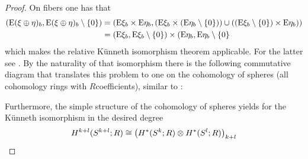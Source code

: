 \begin{Cor}
\begin{proof}
    On fibers one has that
    \begin{align*}
      (\mathrm{E}(\xi\oplus\eta)_b, {\mathrm{E}(\xi\oplus\eta)_b}\setminus\{0\})
      &= \left(
        \mathrm{E}\xi_b\times\mathrm{E}\eta_b,
        \left(\mathrm{E}\xi_b\times({\mathrm{E}\eta_b}\setminus\{0\})\right)
        \cup
        \left(({\mathrm{E}\xi_b}\setminus\{0\})\times\mathrm{E}\eta_b\right)
        \right)
        \\
      &= (\mathrm{E}\xi_b, {\mathrm{E}\xi_b}\setminus\{0\})\times(\mathrm{E}\eta_b, {\mathrm{E}\eta_b}\setminus\{0\}
    \end{align*}
    which makes the relative Künneth isomorphism theorem applicable.
    For the latter see \forexample \cite[Theorem~3.18]{hatcher}.
    By the naturality of that isomorphism there is the
    following commutative diagram that translates this problem to one
    on the cohomology of spheres (all cohomology rings with
    $R$\nbd{}coefficients),
    similar to \cite[proof of 3.19, p.~221]{hatcher}:
    \begin{center}
    \end{center}
    Furthermore, the simple structure of the cohomology of spheres
    yields for the Künneth isomorphism in the desired degree
    \begin{align*}
      \H^{\rkk+\rkl}(\Sphere{\rkk+\rkl};R)
      &\cong
        \left(\H^*(\Sphere{\rkk}; R)\otimes \H^*(\Sphere{\rkl}; R)\right)_{\rkk+\rkl}\\

\end{align*}
\end{proof}
\end{Cor}
